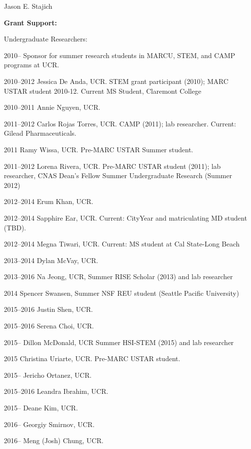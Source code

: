 \documentclass[10pt]{article}
\begin{document}
\begin{cv}{\centerline{Jason E. Stajich}}
\begin{cvlistcompact}{\bf Grant Support:}
\begin{cvlistcompact}{Undergraduate Researchers:}
\item[2010--] Sponsor for summer research students in MARCU, STEM, and CAMP
  programs at UCR.
\item [2010--2012] Jessica De Anda, UCR. STEM grant participant
  (2010); MARC USTAR student 2010-12. Current MS Student, Claremont College
\item [2010--2011] Annie Nguyen, UCR.
\item [2011--2012] Carlos Rojas Torres, UCR. CAMP (2011); lab
  researcher. Current: Gilead Pharmaceuticals.
\item [2011] Ramy Wissa, UCR. Pre-MARC USTAR Summer student.
\item [2011--2012] Lorena Rivera, UCR. Pre-MARC USTAR student (2011); lab
  researcher, CNAS Dean's Fellow Summer Undergraduate Research (Summer 2012)
\item [2012--2014] Erum Khan, UCR.
\item [2012--2014] Sapphire Ear, UCR. Current: CityYear and
  matriculating MD student (TBD).
\item [2012--2014] Megna Tiwari, UCR. Current: MS student at Cal
  State-Long Beach
\item [2013--2014] Dylan McVay, UCR.
\item [2013--2016] Na Jeong, UCR, Summer RISE Scholar (2013) and lab researcher
\item [2014] Spencer Swansen, Summer NSF REU student (Seattle Pacific University)
\item [2015--2016] Justin Shen, UCR.
\item [2015--2016] Serena Choi, UCR.
\item [2015--] Dillon McDonald, UCR Summer HSI-STEM (2015) and lab researcher
\item [2015] Christina Uriarte, UCR. Pre-MARC USTAR student.
\item [2015--] Jericho Ortanez, UCR.
\item [2015--2016] Leandra Ibrahim, UCR.
\item [2015--] Deane Kim, UCR.
\item [2016--] Georgiy Smirnov, UCR.
\item [2016--] Meng (Josh) Chung, UCR.
  
\end{cvlistcompact}


\end{cvlistcompact}
\end{cv}
\end{document}
